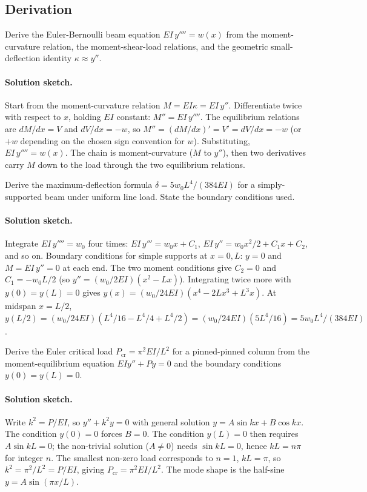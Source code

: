 \subsection*{Derivation}

\begin{exercise}
Derive the Euler-Bernoulli beam equation $EI \,y'''' = w(x)$ from
the moment-curvature relation, the moment-shear-load relations, and
the geometric small-deflection identity $\kappa \approx y''$.

\paragraph{Solution sketch.} Start from the moment-curvature relation
$M = EI\kappa = EI\,y''$. Differentiate twice with respect to $x$,
holding $EI$ constant: $M'' = EI\,y''''$. The equilibrium relations are
$dM/dx = V$ and $dV/dx = -w$, so $M'' = (dM/dx)' = V' = dV/dx = -w$ (or
$+w$ depending on the chosen sign convention for $w$). Substituting,
$EI\,y'''' = w(x)$. The chain is moment-curvature ($M$ to $y''$), then
two derivatives carry $M$ down to the load through the two equilibrium
relations.
\end{exercise}

\begin{exercise}
Derive the maximum-deflection formula $\delta = 5 w_0 L^4/(384 EI)$
for a simply-supported beam under uniform line load. State the
boundary conditions used.

\paragraph{Solution sketch.} Integrate $EI\,y'''' = w_0$ four times:
$EI\,y''' = w_0 x + C_1$, $EI\,y'' = w_0 x^2/2 + C_1 x + C_2$, and so
on. Boundary conditions for simple supports at $x = 0, L$: $y = 0$ and
$M = EI\,y'' = 0$ at each end. The two moment conditions give $C_2 = 0$
and $C_1 = -w_0L/2$ (so $y'' = (w_0/2EI)(x^2 - Lx)$). Integrating twice
more with $y(0) = y(L) = 0$ gives $y(x) = (w_0/24EI)(x^4 - 2Lx^3 +
L^3x)$. At midspan $x = L/2$, $y(L/2) = (w_0/24EI)(L^4/16 - L^4/4 +
L^4/2) = (w_0/24EI)(5L^4/16) = 5w_0L^4/(384EI)$.
\end{exercise}

\begin{exercise}
Derive the Euler critical load $P_{\text{cr}} = \pi^2 EI/L^2$ for a
pinned-pinned column from the moment-equilibrium equation $EI y'' +
P y = 0$ and the boundary conditions $y(0) = y(L) = 0$.

\paragraph{Solution sketch.} Write $k^2 = P/EI$, so $y'' + k^2 y = 0$
with general solution $y = A\sin kx + B\cos kx$. The condition $y(0) =
0$ forces $B = 0$. The condition $y(L) = 0$ then requires $A\sin kL =
0$; the non-trivial solution ($A \neq 0$) needs $\sin kL = 0$, hence
$kL = n\pi$ for integer $n$. The smallest non-zero load corresponds to
$n = 1$, $kL = \pi$, so $k^2 = \pi^2/L^2 = P/EI$, giving $P_{\text{cr}}
= \pi^2EI/L^2$. The mode shape is the half-sine $y = A\sin(\pi x/L)$.
\end{exercise}

